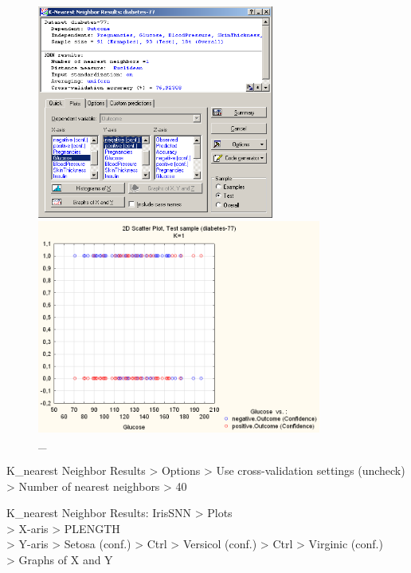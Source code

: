 \begin{figure}[!h]
  \centering

  \begin{minipage}{0.49\textwidth}
    \centering

    \includegraphics[height=7cm]
    {inc/v5_22.PNG}

    \caption{\_}

    \label{fig:19_1}
  \end{minipage}
  \begin{minipage}{0.49\textwidth}
    \centering

    \includegraphics[height=7cm]
    {inc/v5_23.PNG}

    \caption{\_}

    \label{fig:20_1}
  \end{minipage}
\end{figure}

K\_nearest Neighbor Results > Options > Use cross-validation settings (uncheck) \\
> Number of nearest neighbors > 40

K\_nearest Neighbor Results: IrisSNN > Plots \\
> X-aris > PLENGTH \\
> Y-aris > Setosa (conf.) > Ctrl > Versicol (conf.) > Ctrl > Virginic (conf.) \\
> Graphs of X and Y

